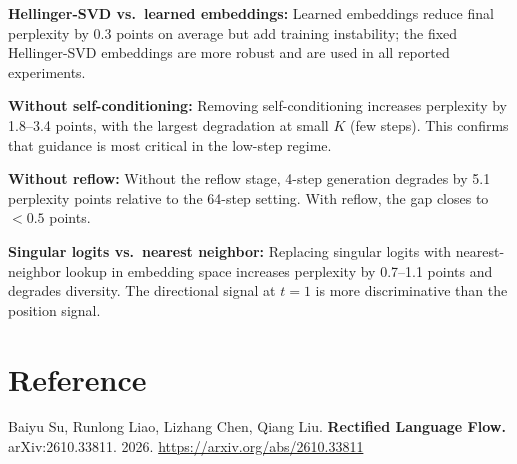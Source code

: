 \documentclass[10pt,twocolumn]{article}
\begin{document}
\textbf{Hellinger-SVD vs.\ learned embeddings:}
Learned embeddings reduce final perplexity by 0.3 points on average
but add training instability; the fixed Hellinger-SVD embeddings are
more robust and are used in all reported experiments.

\textbf{Without self-conditioning:}
Removing self-conditioning increases perplexity by 1.8--3.4 points,
with the largest degradation at small $K$ (few steps). This confirms
that guidance is most critical in the low-step regime.

\textbf{Without reflow:}
Without the reflow stage, 4-step generation degrades by 5.1 perplexity
points relative to the 64-step setting. With reflow, the gap closes to
$<0.5$ points.

\textbf{Singular logits vs.\ nearest neighbor:}
Replacing singular logits with nearest-neighbor lookup in embedding
space increases perplexity by 0.7--1.1 points and degrades diversity.
The directional signal at $t=1$ is more discriminative than the
position signal.

\section*{Reference}

Baiyu Su, Runlong Liao, Lizhang Chen, Qiang Liu.
\textbf{Rectified Language Flow.}
arXiv:2610.33811. 2026.
\url{https://arxiv.org/abs/2610.33811}
\end{document}
